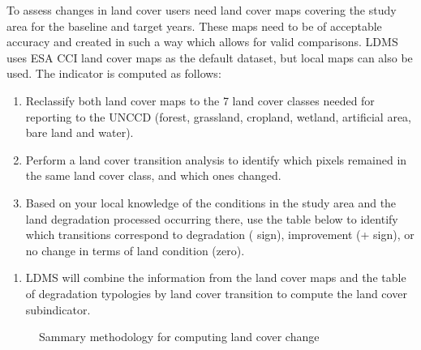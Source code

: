 \documentclass[letterpaper,10pt,english]{sphinxmanual}
\let\sphinxpxdimen\pdfpxdimen\else\newdimen\sphinxpxdimen
\begin{document}
\sphinxAtStartPar
To assess changes in land cover users need land cover maps covering the study
area for the baseline and target years. These maps need to be of acceptable
accuracy and created in such a way which allows for valid comparisons.
LDMS uses ESA CCI land cover maps as the default dataset, but local
maps can also be used. The indicator is computed as follows:
\begin{enumerate}
%
\item {} 
\sphinxAtStartPar
Reclassify both land cover maps to the 7 land cover classes needed for
reporting to the UNCCD (forest, grassland, cropland, wetland, artificial
area, bare land and water).

\item {} 
\sphinxAtStartPar
Perform a land cover transition analysis to identify which pixels remained
in the same land cover class, and which ones changed.

\item {} 
\sphinxAtStartPar
Based on your local knowledge of the conditions in the study area and the
land degradation processed occurring there, use the table below to identify
which transitions correspond to degradation (\sphinxhyphen{} sign), improvement (+ sign),
or no change in terms of land condition (zero).

\end{enumerate}

\begin{enumerate}
%
\setcounter{enumi}{3}
\item {} 
\sphinxAtStartPar
LDMS will combine the information from the land cover maps and the
table of degradation typologies by land cover transition to compute the land
cover sub\sphinxhyphen{}indicator.

\end{enumerate}

\begin{figure}[H]
\centering
\capstart

\noindent\sphinxincludegraphics[width=621\sphinxpxdimen,height=251\sphinxpxdimen]{{lulc}.png}
\caption{Sammary methodology for computing land cover change}\label{\detokenize{Background/LD_indicators:id5}}\end{figure}
\end{document}
